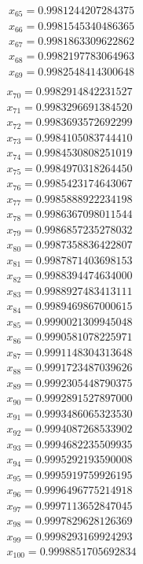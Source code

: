\begin{multicols}{3}
\begin{align*}
		x_{65} = 0.9981244207284375\\
		x_{66} = 0.9981545340486365\\
		x_{67} = 0.9981863309622862\\
		x_{68} = 0.9982197783064963\\
		x_{69} = 0.9982548414300648\\
	\end{align*}
	\vfill
	\columnbreak
	\begin{align*}
		x_{70} = 0.9982914842231527\\
		x_{71} = 0.9983296691384520\\
		x_{72} = 0.9983693572692299\\
		x_{73} = 0.9984105083744410\\
		x_{74} = 0.9984530808251019\\
		x_{75} = 0.9984970318264450\\
		x_{76} = 0.9985423174643067\\
		x_{77} = 0.9985888922234198\\
		x_{78} = 0.9986367098011544\\
		x_{79} = 0.9986857235278032\\
		x_{80} = 0.9987358836422807\\
		x_{81} = 0.9987871403698153\\
		x_{82} = 0.9988394474634000\\
		x_{83} = 0.9988927483413111\\
		x_{84} = 0.9989469867000615\\
		x_{85} = 0.9990021309945048\\
		x_{86} = 0.9990581078225971\\
		x_{87} = 0.9991148304313648\\
		x_{88} = 0.9991723487039626\\
		x_{89} = 0.9992305448790375\\
		x_{90} = 0.9992891527897000\\
		x_{91} = 0.9993486065323530\\
		x_{92} = 0.9994087268533902\\
		x_{93} = 0.9994682235509935\\
		x_{94} = 0.9995292193590008\\
		x_{95} = 0.9995919759926195\\
		x_{96} = 0.9996496775214918\\
		x_{97} = 0.9997113652847045\\
		x_{98} = 0.9997829628126369\\
		x_{99} = 0.9998293169924293\\
		x_{100} = 0.9998851705692834\\
	\end{align*}
	\vfill
\end{multicols}

